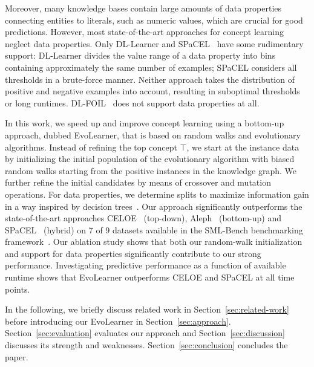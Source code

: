 Moreover, many knowledge bases contain large amounts of data properties connecting entities to literals, such as numeric values, which are crucial for good predictions. However, most state-of-the-art approaches for concept learning neglect data properties. Only \mbox{DL-Learner} \citep{Lehmann2010Concept} and \mbox{SPaCEL}~\citep{Tran2017Parallel} have some rudimentary support: DL-Learner divides the value range of a data property into bins containing approximately the same number of examples; \mbox{SPaCEL} considers all thresholds in a brute-force manner. Neither approach takes the distribution of positive and negative examples into account, resulting in suboptimal thresholds or long runtimes. DL-FOIL~\citep{Fanizzi2018DLFoil} does not support data properties at all.

In this work, we speed up and improve concept learning using a bottom-up approach, dubbed EvoLearner, that is based on random walks and evolutionary algorithms. Instead of refining the top concept $\top$, we start at the instance data by initializing the initial population of the evolutionary algorithm with biased random walks starting from the positive instances in the knowledge graph. We further refine the initial candidates by means of crossover and mutation operations. For data properties, we determine splits to maximize information gain in a way inspired by decision trees~\citep{Quinlan1986Induction}. Our approach significantly outperforms the state-of-the-art approaches CELOE~\cite{Lehmann2009DL-Learner} (top-down), Aleph~\cite{Muggleton1995Inverse} (bottom-up) and SPaCEL~\cite{Tran2012Approach} (hybrid) on 7 of 9 datasets available in the SML-Bench benchmarking framework~\citep{Westphal2019SML-Bench}. Our ablation study shows that both our random-walk initialization and support for data properties significantly contribute to our strong performance. Investigating predictive performance as a function of available runtime shows that EvoLearner outperforms CELOE and SPaCEL at all time points.

In the following, we briefly discuss related work in Section~\ref{sec:related-work} before introducing our EvoLearner in Section~\ref{sec:approach}. Section~\ref{sec:evaluation} evaluates our approach and Section~\ref{sec:discussion} discusses its strength and weaknesses. Section~\ref{sec:conclusion} concludes the paper.
